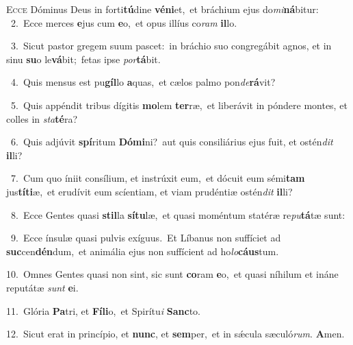 \lettrine{\initial\textcolor{\initialcolor}{E}}{cce} Dóminus Deus in forti\-\textbf{tú}\-dine \textbf{vé}\-\textbf{ni}et,~\star et bráchium ejus do\-\textit{mi}\-\textbf{ná}bitur:\\
{\numbfont\textcolor{\numbcolor}{~2.}}~Ecce merces \textbf{e}\-jus cum \textbf{e}\-o,~\star et opus illíus co\textit{ram} \textbf{il}\-lo.\par
{\numbfont\textcolor{\numbcolor}{~3.}}~Sicut pastor gregem suum pascet:~\dagger in bráchio suo congregábit agnos, et in sinu \textbf{su}\-o le\-\textbf{vá}\-bit;~\star fetas ipse \textit{por}\-\textbf{tá}bit.\par
{\numbfont\textcolor{\numbcolor}{~4.}}~Quis mensus est pu\-\textbf{gíl}\-lo \textbf{a}\-quas,~\star et cælos palmo pon\-\textit{de}\-\textbf{rá}vit?\par
{\numbfont\textcolor{\numbcolor}{~5.}}~Quis appéndit tribus dígitis \textbf{mo}\-lem \textbf{ter}\-ræ,~\star et liberávit in póndere montes, et colles in \textit{sta}\-\textbf{té}ra?\par
{\numbfont\textcolor{\numbcolor}{~6.}}~Quis adjúvit \textbf{spí}\-ritum \textbf{Dó}\-\textbf{mi}ni?~\star aut quis consiliárius ejus fuit, et ostén\textit{dit} \textbf{il}\-li?\par
{\numbfont\textcolor{\numbcolor}{~7.}}~Cum quo íniit consílium, et instrúxit eum,~\dagger et dócuit eum sémi\textbf{tam} jus\-\textbf{tí}\-\textbf{ti}æ,~\star et erudívit eum scíentiam, et viam prudéntiæ ostén\textit{dit} \textbf{il}\-li?\par
{\numbfont\textcolor{\numbcolor}{~8.}}~Ecce Gentes quasi \textbf{stil}\-la \textbf{sí}\-\textbf{tu}læ,~\star et quasi moméntum statéræ re\-\textit{pu}\-\textbf{tá}tæ sunt:\par
{\numbfont\textcolor{\numbcolor}{~9.}}~Ecce ínsulæ quasi pulvis exíguus.~\dagger Et Líbanus non suffíciet ad \textbf{suc}\-cen\-\textbf{dén}\-dum,~\star et animália ejus non suffícient ad ho\-\textit{lo}\-\textbf{cáus}tum.\par
{\numbfont\textcolor{\numbcolor}{10.}}~Omnes Gentes quasi non sint, sic sunt \textbf{co}\-ram \textbf{e}\-o,~\star et quasi níhilum et ináne reputátæ \textit{sunt} \textbf{e}\-i.\par
{\numbfont\textcolor{\numbcolor}{11.}}~Glória \textbf{Pa}\-tri, et \textbf{Fí}\-\textbf{li}o,~\star et Spirítu\textit{i} \textbf{Sanc}\-to.\par
{\numbfont\textcolor{\numbcolor}{12.}}~Sicut erat in princípio, et \textbf{nunc}\-, et \textbf{sem}\-per,~\star et in sǽcula sæculó\-\textit{rum}\-. \textbf{A}\-men.\par
